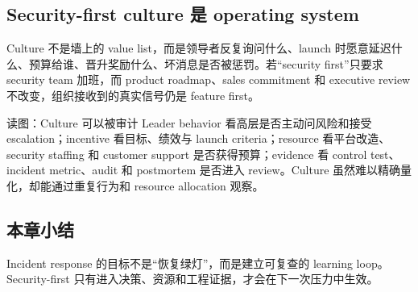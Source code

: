 
\subsection{Security-first culture 是 operating system}

Culture 不是墙上的 value list，而是领导者反复询问什么、launch 时愿意延迟什么、预算给谁、晋升奖励什么、坏消息是否被惩罚。若“security first”只要求 security team 加班，而 product roadmap、sales commitment 和 executive review 不改变，组织接收到的真实信号仍是 feature first。


\begin{knowledgebox}{读图：Culture 可以被审计}
Leader behavior 看高层是否主动问风险和接受 escalation；incentive 看目标、绩效与 launch criteria；resource 看平台改造、security staffing 和 customer support 是否获得预算；evidence 看 control test、incident metric、audit 和 postmortem 是否进入 review。Culture 虽然难以精确量化，却能通过重复行为和 resource allocation 观察。
\end{knowledgebox}

\subsection{本章小结}

Incident response 的目标不是“恢复绿灯”，而是建立可复查的 learning loop。Security-first 只有进入决策、资源和工程证据，才会在下一次压力中生效。

